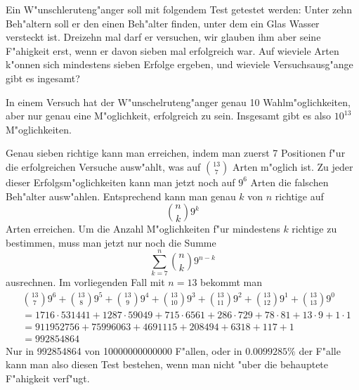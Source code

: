 Ein W"unschleruteng"anger soll mit folgendem Test getestet werden:
Unter zehn Beh"altern soll er den einen Beh"alter finden, unter dem
ein Glas Wasser versteckt ist. Dreizehn mal darf er versuchen, wir
glauben ihm aber seine F"ahigkeit erst, wenn er davon sieben mal
erfolgreich war. Auf wieviele Arten k"onnen sich mindestens sieben
Erfolge ergeben, und wieviele Versuchsausg"ange gibt es ingesamt?

\begin{loesung}
In einem Versuch hat der W"unschelruteng"anger genau 10 Wahlm"oglichkeiten,
aber nur genau eine M"oglichkeit, erfolgreich zu sein.
Insgesamt gibt es also $10^13$ M"oglichkeiten. 

Genau sieben richtige kann man erreichen, indem man zuerst 7 Positionen
f"ur die erfolgreichen Versuche ausw"ahlt, was auf $\binom{13}{7}$
Arten m"oglich ist. Zu jeder dieser Erfolgsm"oglichkeiten kann man jetzt
noch auf $9^6$ Arten die falschen Beh"alter ausw"ahlen. Entsprechend
kann man genau $k$ von $n$ richtige auf 
\[
\binom{n}{k}9^k
\]
Arten erreichen. Um die Anzahl M"oglichkeiten f"ur mindestens $k$ richtige
zu bestimmen, muss man jetzt nur noch die Summe
\[
\sum_{k=7}^{n}
\binom{n}{k}9^{n-k}
\]
ausrechnen. Im vorliegenden Fall mit $n=13$ bekommt man
\begin{align*}
&\binom{13}{7}9^6
+
\binom{13}{8}9^5
+
\binom{13}{9}9^4
+
\binom{13}{10}9^3
+
\binom{13}{11}9^2
+
\binom{13}{12}9^1
+
\binom{13}{13}9^0
\\
&=
1716\cdot 531441
+
1287\cdot 59049
+
715\cdot 6561
+
286\cdot 729
+
78\cdot 81
+
13\cdot 9
+
1\cdot 1
\\
&=
911952756
+
75996063
+
4691115
+
208494
+
6318
+
117
+
1
\\
&=
992854864
\end{align*}
Nur in 992854864 von 10000000000000 F"allen, oder in 
$0.0099285\%$ der F"alle kann man also diesen Test bestehen, wenn man
nicht "uber die behauptete F"ahigkeit verf"ugt.
\end{loesung}

